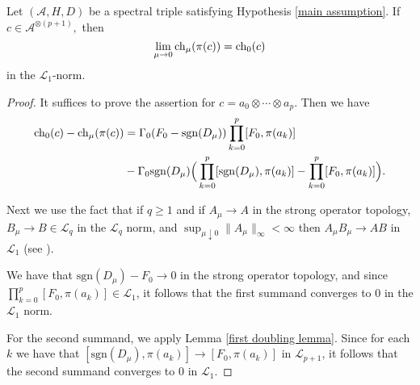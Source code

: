    
    \begin{lem}\label{second doubling lemma} 
        Let $(\mathcal{A},H,D)$ be a spectral triple satisfying Hypothesis \ref{main assumption}. If $c\in\mathcal{A}^{\otimes (p+1)},$ then
        \begin{equation*}
            \lim_{\mu\to 0} {\rm ch}_{\mu}(\pi(c)) = {\rm ch}_0(c)
        \end{equation*}
        in the $\mathcal{L}_1$-norm.
    \end{lem}
    \begin{proof} 
        It suffices to prove the assertion for $c=a_0\otimes\cdots\otimes a_p.$ Then we have
        \begin{align*}
                 {\rm ch}_{0}(c)-{\rm ch}_\mu(\pi(c)) &= \Gamma_0(F_0-{\rm sgn}(D_{\mu}))\prod_{k=0}^p[F_0,\pi(a_k)]\\
                                                           & - \Gamma_0\mathrm{sgn}(D_\mu)\Big(\prod_{k=0}^p[{\rm sgn}(D_{\mu}),\pi(a_k)]-\prod_{k=0}^p[F_0,\pi(a_k)]\Big).
        \end{align*}
        
        Next we use the fact that if $q \geq 1$ and if $A_\mu\to A$ in the strong operator topology, $B_\mu\to B\in \mathcal{L}_q$ in the $\mathcal{L}_q$ norm, and $\sup_{\mu\downarrow 0}\|A_\mu\|_\infty < \infty$ then $A_\mu B_\mu\to AB$
        in $\mathcal{L}_1$ (see \cite[Chapter 2, Example 3]{Simon}).
        
        We have that $\mathrm{sgn}(D_\mu)- F_0\to 0$ in the strong operator topology, and since $\prod_{k=0}^p [F_0,\pi(a_k)] \in \mathcal{L}_1$, it follows that the first
        summand converges to $0$ in the $\mathcal{L}_1$ norm.
                
        For the second summand, we apply Lemma \ref{first doubling lemma}. Since for each $k$ we have that $[\mathrm{sgn}(D_\mu),\pi(a_k)] \to [F_0,\pi(a_k)]$
        in $\mathcal{L}_{p+1}$, it follows that the second summand converges to $0$ in $\mathcal{L}_1$.
    \end{proof}
    
